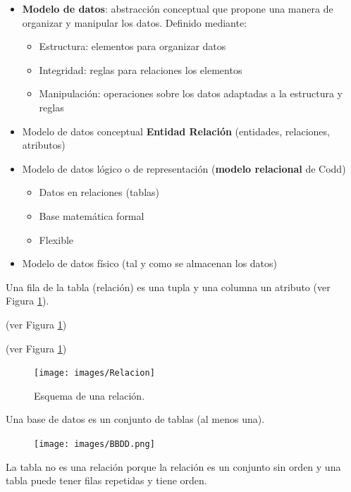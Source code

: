 \documentclass[]{book}
\providecommand{\tightlist}{%
  \setlength{\itemsep}{0pt}\setlength{\parskip}{0pt}}
\begin{document}
\begin{itemize}
\item
  \textbf{Modelo de datos}: abstracción conceptual que propone una
  manera de organizar y manipular los datos. Definido mediante:

  \begin{itemize}
  \tightlist
  \item
    Estructura: elementos para organizar datos
  \item
    Integridad: reglas para relaciones los elementos
  \item
    Manipulación: operaciones sobre los datos adaptadas a la estructura
    y reglas
  \end{itemize}
\item
  Modelo de datos conceptual \textbf{Entidad Relación} (entidades,
  relaciones, atributos)
\item
  Modelo de datos lógico o de representación (\textbf{modelo relacional}
  de Codd)

  \begin{itemize}
  \tightlist
  \item
    Datos en relaciones (tablas)
  \item
    Base matemática formal
  \item
    Flexible
  \end{itemize}
\item
  Modelo de datos físico (tal y como se almacenan los datos)
\end{itemize}

Una fila de la tabla (relación) es una tupla y una columna un atributo
(ver Figura \ref{fig:relacion}).

(ver Figura \ref{fig:relacion})

(ver Figura \ref{fig:relacion})

\begin{figure}[!htb]

{\centering \texttt{[image: images/Relacion]} 

}

\caption{Esquema de una relación.}\label{fig:relacion}
\end{figure}

Una base de datos es un conjunto de tablas (al menos una).

\begin{figure}
\centering
\texttt{[image: images/BBDD.png]}
\caption{}
\end{figure}

La tabla no es una relación porque la relación es un conjunto sin orden
y una tabla puede tener filas repetidas y tiene orden.
\end{document}

